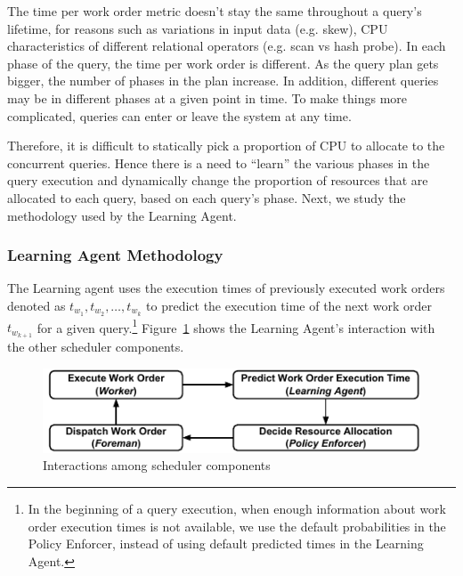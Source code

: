 The time per work order metric doesn't stay the same throughout a query's lifetime, for reasons such as variations in input data (e.g. skew), CPU characteristics of different relational operators (e.g. scan vs hash probe).
In each phase of the query, the time per work order is different.
As the query plan gets bigger, the number of phases in the plan increase.
In addition, different queries may be in different phases at a given point in time.
To make things more complicated, queries can enter or leave the system at any time.

Therefore, it is difficult to statically pick a proportion of CPU to allocate to the concurrent queries. 
Hence there is a need to ``learn'' the various phases in the query execution and dynamically change the proportion of resources that are allocated to each query, based on each query's phase.
Next, we study the methodology used by the Learning Agent.
\subsubsection{Learning Agent Methodology}
The Learning agent uses the execution times of previously executed work orders 
denoted as $t_{w_{1}}, t_{w_{2}}, \ldots, t_{w_{k}}$ to predict the execution time of 
the next work order $t_{w_{k+1}}$ for a given query.\footnote{In the beginning of a query execution, when enough information about work order execution times is not available, we use the default probabilities in the Policy Enforcer, instead of using default predicted times in the Learning Agent.}
Figure~\ref{fig:scheduler-cycle} shows the Learning Agent's interaction with the other scheduler components.

\begin{figure}[]
	\centering
	\includegraphics[width=\linewidth]{figures/Compact-SchedulerCycle.pdf}
	\vspace{-1.5em}
	\caption{Interactions among scheduler components}
	\label{fig:scheduler-cycle}
	\vspace{-1.5em}
\end{figure}

